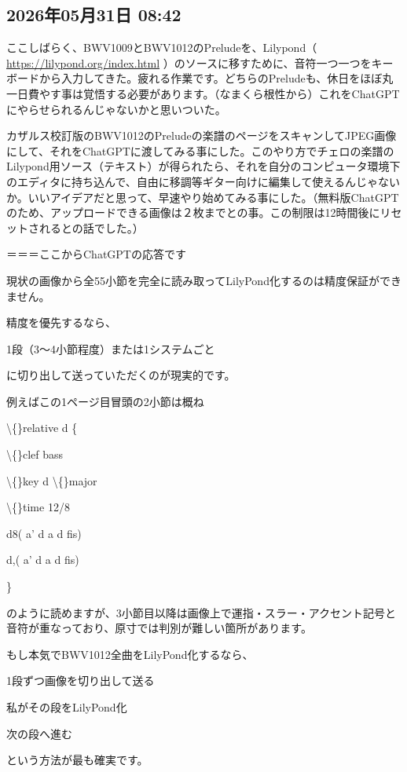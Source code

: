 \subsection*{2026年05月31日 08:42}

ここしばらく、BWV1009とBWV1012のPreludeを、Lilypond（ \url{https://lilypond.org/index.html} ）のソースに移すために、音符一つ一つをキーボードから入力してきた。疲れる作業です。どちらのPreludeも、休日をほぼ丸一日費やす事は覚悟する必要があります。（なまくら根性から）これをChatGPTにやらせられるんじゃないかと思いついた。

カザルス校訂版のBWV1012のPreludeの楽譜のページをスキャンしてJPEG画像にして、それをChatGPTに渡してみる事にした。このやり方でチェロの楽譜のLilypond用ソース（テキスト）が得られたら、それを自分のコンピュータ環境下のエディタに持ち込んで、自由に移調等ギター向けに編集して使えるんじゃないか。いいアイデアだと思って、早速やり始めてみる事にした。（無料版ChatGPTのため、アップロードできる画像は２枚までとの事。この制限は12時間後にリセットされるとの話でした。）

＝＝＝ここからChatGPTの応答です

現状の画像から全55小節を完全に読み取ってLilyPond化するのは精度保証ができません。

精度を優先するなら、

1段（3〜4小節程度）または1システムごと

に切り出して送っていただくのが現実的です。

例えばこの1ページ目冒頭の2小節は概ね

\textbackslash\{\}relative d \{

\textbackslash\{\}clef bass

\textbackslash\{\}key d \textbackslash\{\}major

\textbackslash\{\}time 12/8

d8( a' d a d fis)

d,( a' d a d fis)

\}

のように読めますが、3小節目以降は画像上で運指・スラー・アクセント記号と音符が重なっており、原寸では判別が難しい箇所があります。

もし本気でBWV1012全曲をLilyPond化するなら、

1段ずつ画像を切り出して送る

私がその段をLilyPond化

次の段へ進む

という方法が最も確実です。

